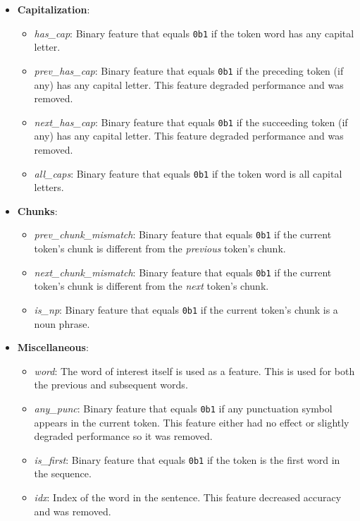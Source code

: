 \documentclass{article}
\begin{document}
  \begin{itemize}
    \item \textbf{Capitalization}:
      \begin{itemize}
        \item \textit{has\_cap}: Binary feature that equals \texttt{0b1} if the token word has any capital letter.
        \item \textit{prev\_has\_cap}: Binary feature that equals \texttt{0b1} if the preceding token (if any) has any capital letter. This feature degraded performance and was removed.
        \item \textit{next\_has\_cap}: Binary feature that equals \texttt{0b1} if the succeeding token (if any) has any capital letter. This feature degraded performance and was removed.
        \item \textit{all\_caps}: Binary feature that equals \texttt{0b1} if the token word is all capital letters.
      \end{itemize}
    \item \textbf{Chunks}:
      \begin{itemize}
        \item \textit{prev\_chunk\_mismatch}: Binary feature that equals \texttt{0b1} if the current token's chunk is different from the \textit{previous} token's chunk.
        \item \textit{next\_chunk\_mismatch}: Binary feature that equals \texttt{0b1} if the current token's chunk is different from the \textit{next} token's chunk.
        \item \textit{is\_np}: Binary feature that equals \texttt{0b1} if the current token's chunk is a noun phrase.
      \end{itemize}
    \item \textbf{Miscellaneous}:
      \begin{itemize}
        \item \textit{word}: The word of interest itself is used as a feature.  This is used for both the previous and subsequent words.
        \item \textit{any\_punc}: Binary feature that equals \texttt{0b1} if any punctuation symbol appears in the current token.  This feature either had no effect or slightly degraded performance so it was removed.
        \item \textit{is\_first}: Binary feature that equals \texttt{0b1} if the token is the first word in the sequence.
        \item \textit{idx}: Index of the word in the sentence.  This feature decreased accuracy and was removed.

\end{itemize}
\end{itemize}
\end{document}
